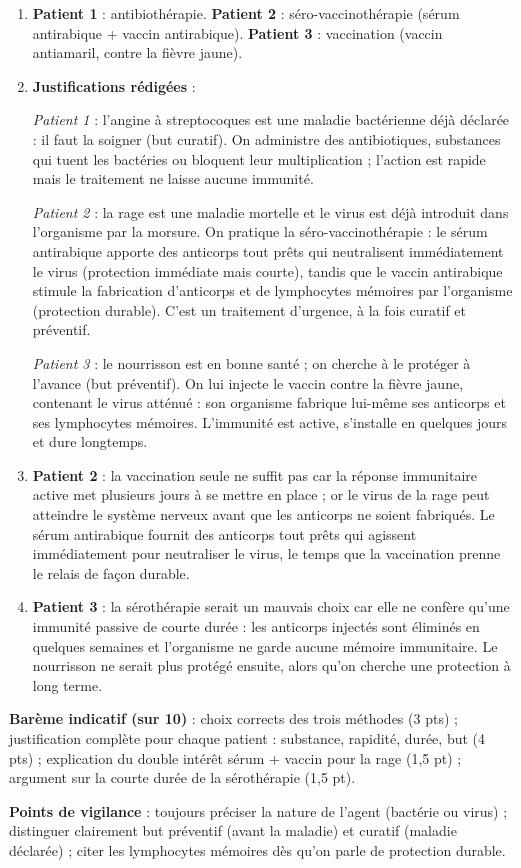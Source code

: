 \documentclass[11pt]{article}
\newcommand{\cle}[1]{{\popxbold\color{popdark}#1}}
\begin{document}
\begin{corrige}
\begin{enumerate}
\item \textbf{Patient 1} : antibiothérapie. \textbf{Patient 2} : séro-vaccinothérapie (sérum antirabique + vaccin antirabique). \textbf{Patient 3} : vaccination (vaccin antiamaril, contre la fièvre jaune).
\item \textbf{Justifications rédigées} :

\emph{Patient 1} : l'angine à streptocoques est une maladie \cle{bactérienne} déjà déclarée : il faut la soigner (but curatif). On administre des antibiotiques, substances qui tuent les bactéries ou bloquent leur multiplication ; l'action est rapide mais le traitement ne laisse aucune immunité.

\emph{Patient 2} : la rage est une maladie mortelle et le virus est déjà introduit dans l'organisme par la morsure. On pratique la séro-vaccinothérapie : le sérum antirabique apporte des anticorps tout prêts qui neutralisent immédiatement le virus (protection immédiate mais courte), tandis que le vaccin antirabique stimule la fabrication d'anticorps et de lymphocytes mémoires par l'organisme (protection durable). C'est un traitement d'urgence, à la fois curatif et préventif.

\emph{Patient 3} : le nourrisson est en bonne santé ; on cherche à le protéger à l'avance (but préventif). On lui injecte le vaccin contre la fièvre jaune, contenant le virus atténué : son organisme fabrique lui-même ses anticorps et ses lymphocytes mémoires. L'immunité est active, s'installe en quelques jours et dure longtemps.
\item \textbf{Patient 2} : la vaccination seule ne suffit pas car la réponse immunitaire active met plusieurs jours à se mettre en place ; or le virus de la rage peut atteindre le système nerveux avant que les anticorps ne soient fabriqués. Le sérum antirabique fournit des anticorps tout prêts qui agissent immédiatement pour neutraliser le virus, le temps que la vaccination prenne le relais de façon durable.
\item \textbf{Patient 3} : la sérothérapie serait un mauvais choix car elle ne confère qu'une immunité passive de courte durée : les anticorps injectés sont éliminés en quelques semaines et l'organisme ne garde aucune mémoire immunitaire. Le nourrisson ne serait plus protégé ensuite, alors qu'on cherche une protection à long terme.
\end{enumerate}
\textbf{Barème indicatif (sur 10)} : choix corrects des trois méthodes (3 pts) ; justification complète pour chaque patient : substance, rapidité, durée, but (4 pts) ; explication du double intérêt sérum + vaccin pour la rage (1,5 pt) ; argument sur la courte durée de la sérothérapie (1,5 pt).

\textbf{Points de vigilance} : toujours préciser la nature de l'agent (bactérie ou virus) ; distinguer clairement but préventif (avant la maladie) et curatif (maladie déclarée) ; citer les lymphocytes mémoires dès qu'on parle de protection durable.
\end{corrige}
\end{document}
